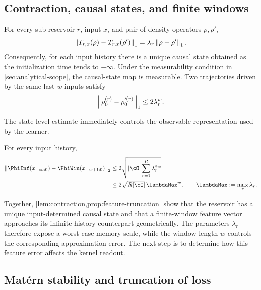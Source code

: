 \subsection{Contraction, causal states, and finite windows}

\begin{lemma}
\label{lem:contraction}
For every sub-reservoir \(r\), input \(x\), and pair of density operators
\(\rho,\rho'\),
\begin{equation}
    \left\lVert T_{r,x}(\rho)-T_{r,x}(\rho')\right\rVert_{1}
    =
    \lambda_r\left\lVert\rho-\rho'\right\rVert_{1}.
    \label{eq:exact-contraction}
\end{equation}
Consequently, for each input history there is a unique causal state obtained
as the initialization time tends to \(-\infty\). Under the measurability
condition in \cref{sec:analytical-scope}, the causal-state map is measurable.
Two trajectories driven by the same last \(w\) inputs satisfy
\begin{equation}
    \left\lVert\rho_0^{(r)}-\rho_0^{\prime(r)}\right\rVert_{1}
    \leq2\lambda_r^w.
    \label{eq:state-forgetting}
\end{equation}
\end{lemma}

The state-level estimate immediately controls the observable representation
used by the learner.

\begin{proposition}
\label{prop:feature-truncation}
For every input history,
\begin{align}
    \norm{\PhiInf(x_{-\infty:0})-\PhiWin(x_{-w+1:0})}_2
    &\leq
    2\sqrt{|\cO|\sum_{r=1}^R\lambda_r^{2w}}
    \label{eq:feature-truncation}\\
    &\leq
    2\sqrt{R|\cO|}\,\lambdaMax^w,
    \qquad
    \lambdaMax:=\max_r\lambda_r.
\end{align}
\end{proposition}

Together, \cref{lem:contraction,prop:feature-truncation} show that the reservoir
has a unique input-determined causal state and that a finite-window feature
vector approaches its infinite-history counterpart geometrically. The
parameters \(\lambda_r\) therefore expose a worst-case memory scale, while the
window length \(w\) controls the corresponding approximation error. The next
step is to determine how this feature error affects the kernel readout.

\subsection{Mat\'ern stability and truncation of loss}

